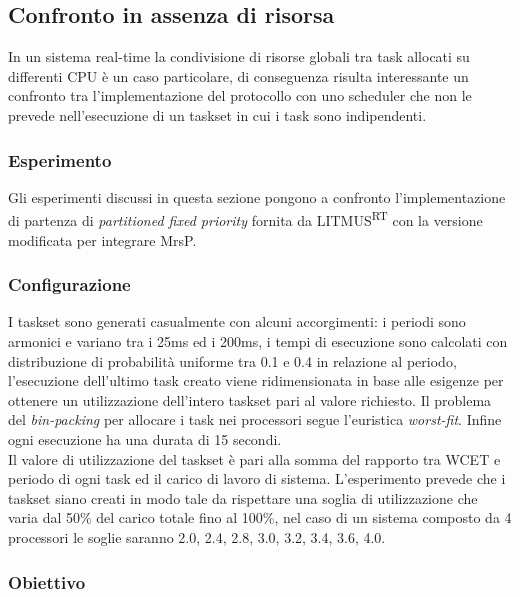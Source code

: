 \subsection{Confronto in assenza di risorsa}
\label{sec:confronto_norisorsa}

\noindent In un sistema real-time la condivisione di risorse globali tra task allocati su differenti CPU è un caso particolare, di conseguenza risulta interessante un confronto tra l'implementazione del protocollo con uno scheduler che non le prevede nell'esecuzione di un taskset in cui i task sono indipendenti.

\subsubsection{Esperimento}
\label{sec:confronto_norisorsa_exp}

\noindent Gli esperimenti discussi in questa sezione pongono a confronto l'implementazione di partenza di \textit{partitioned fixed priority} fornita da LITMUS\textsuperscript{RT} con la versione modificata per integrare MrsP.

\subsubsection{Configurazione}
\label{sec:confronto_norisorsa_conf}

\noindent I taskset sono generati casualmente con alcuni accorgimenti: i periodi sono armonici e variano tra i 25ms ed i 200ms, i tempi di esecuzione sono calcolati con distribuzione di probabilità uniforme tra 0.1 e 0.4 in relazione al periodo, l'esecuzione dell'ultimo task creato viene ridimensionata in base alle esigenze per ottenere un utilizzazione dell'intero taskset pari al valore richiesto. Il problema del \textit{bin-packing} per allocare i task nei processori segue l'euristica \textit{worst-fit}. Infine ogni esecuzione ha una durata di 15 secondi.\\

\noindent Il valore di utilizzazione del taskset è pari alla somma del rapporto tra WCET e periodo di ogni task ed il carico di lavoro di sistema. L'esperimento prevede che i taskset siano creati in modo tale da rispettare una soglia di utilizzazione che varia dal 50\% del carico totale fino al 100\%, nel caso di un sistema composto da 4 processori le soglie saranno 2.0, 2.4, 2.8, 3.0, 3.2, 3.4, 3.6, 4.0.

\subsubsection{Obiettivo}
\label{sec:confronto_norisorsa_ob}

